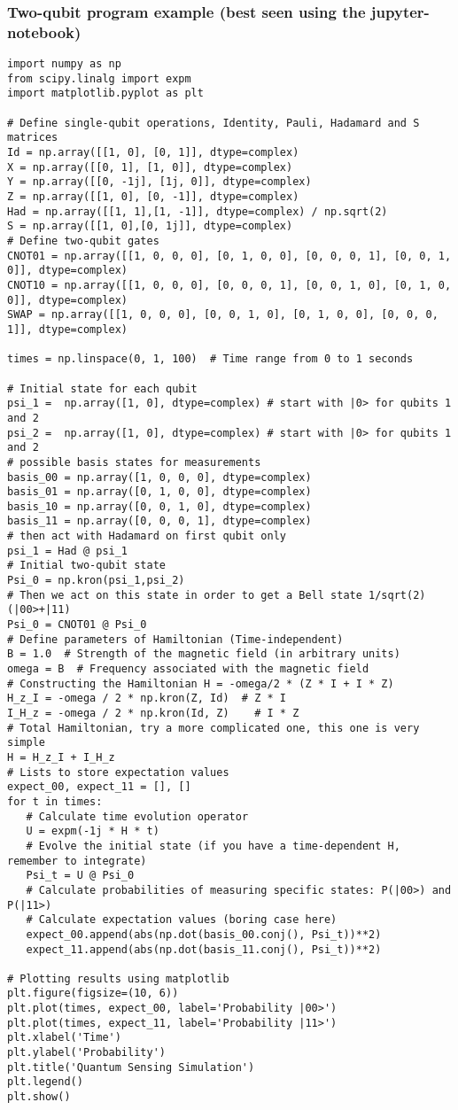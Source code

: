 \documentclass{beamer}
\begin{document}
\begin{frame}
\frametitle{Two-qubit program example (best seen using the jupyter-notebook)}

\begin{verbatim}
import numpy as np
from scipy.linalg import expm
import matplotlib.pyplot as plt

# Define single-qubit operations, Identity, Pauli, Hadamard and S matrices
Id = np.array([[1, 0], [0, 1]], dtype=complex)
X = np.array([[0, 1], [1, 0]], dtype=complex)
Y = np.array([[0, -1j], [1j, 0]], dtype=complex)
Z = np.array([[1, 0], [0, -1]], dtype=complex)
Had = np.array([[1, 1],[1, -1]], dtype=complex) / np.sqrt(2)
S = np.array([[1, 0],[0, 1j]], dtype=complex)
# Define two-qubit gates
CNOT01 = np.array([[1, 0, 0, 0], [0, 1, 0, 0], [0, 0, 0, 1], [0, 0, 1, 0]], dtype=complex)
CNOT10 = np.array([[1, 0, 0, 0], [0, 0, 0, 1], [0, 0, 1, 0], [0, 1, 0, 0]], dtype=complex)
SWAP = np.array([[1, 0, 0, 0], [0, 0, 1, 0], [0, 1, 0, 0], [0, 0, 0, 1]], dtype=complex)

times = np.linspace(0, 1, 100)  # Time range from 0 to 1 seconds

# Initial state for each qubit
psi_1 =  np.array([1, 0], dtype=complex) # start with |0> for qubits 1 and 2
psi_2 =  np.array([1, 0], dtype=complex) # start with |0> for qubits 1 and 2
# possible basis states for measurements
basis_00 = np.array([1, 0, 0, 0], dtype=complex)
basis_01 = np.array([0, 1, 0, 0], dtype=complex)
basis_10 = np.array([0, 0, 1, 0], dtype=complex)
basis_11 = np.array([0, 0, 0, 1], dtype=complex)
# then act with Hadamard on first qubit only
psi_1 = Had @ psi_1
# Initial two-qubit state
Psi_0 = np.kron(psi_1,psi_2)
# Then we act on this state in order to get a Bell state 1/sqrt(2)(|00>+|11)
Psi_0 = CNOT01 @ Psi_0
# Define parameters of Hamiltonian (Time-independent)
B = 1.0  # Strength of the magnetic field (in arbitrary units)
omega = B  # Frequency associated with the magnetic field
# Constructing the Hamiltonian H = -omega/2 * (Z * I + I * Z)
H_z_I = -omega / 2 * np.kron(Z, Id)  # Z * I
I_H_z = -omega / 2 * np.kron(Id, Z)    # I * Z
# Total Hamiltonian, try a more complicated one, this one is very simple
H = H_z_I + I_H_z   
# Lists to store expectation values
expect_00, expect_11 = [], []
for t in times:
   # Calculate time evolution operator
   U = expm(-1j * H * t)
   # Evolve the initial state (if you have a time-dependent H, remember to integrate)
   Psi_t = U @ Psi_0
   # Calculate probabilities of measuring specific states: P(|00>) and P(|11>)
   # Calculate expectation values (boring case here)
   expect_00.append(abs(np.dot(basis_00.conj(), Psi_t))**2)
   expect_11.append(abs(np.dot(basis_11.conj(), Psi_t))**2)

# Plotting results using matplotlib
plt.figure(figsize=(10, 6))
plt.plot(times, expect_00, label='Probability |00>')
plt.plot(times, expect_11, label='Probability |11>')
plt.xlabel('Time')
plt.ylabel('Probability')
plt.title('Quantum Sensing Simulation')
plt.legend()
plt.show()


\end{verbatim}
\end{frame}
\end{document}
